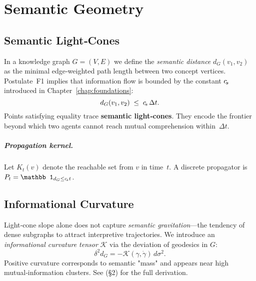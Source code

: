 
\chapter{Semantic Geometry}\label{chap:geometry}

\section{Semantic Light‑Cones}\label{sec:lightcones}

In a knowledge graph $G=(V,E)$ we define the \emph{semantic distance}
$d_G(v_1,v_2)$ as the minimal edge‑weighted path length between two
concept vertices.  Postulate F1 implies that information flow is bounded
by the constant $c_{\!s}$ introduced in Chapter~\ref{chap:foundations}:
\begin{equation}
  d_G(v_1,v_2) \;\le\; c_{\!s}\,\Delta t.
  \label{eq:semantic-cone}
\end{equation}
Points satisfying equality trace \textbf{semantic light‑cones}.  They
encode the frontier beyond which two agents cannot reach mutual
comprehension within $\Delta t$.


\paragraph{Propagation kernel.}  Let $K_t(v)$ denote the reachable set
from $v$ in time $t$.  A discrete propagator is
$P_t=\mathbb 1_{d_G\le\cs t}$.

\section{Informational Curvature}\label{sec:curvature}

Light‑cone slope alone does not capture \emph{semantic gravitation}—the
tendency of dense subgraphs to attract interpretive trajectories.  We
introduce an \emph{informational curvature tensor} $\mathcal K$ via the
deviation of geodesics in $G$:
\begin{equation}
  \delta^2 d_G = -\mathcal K(\gamma,\dot\gamma)\,d\sigma^2.
\end{equation}
Positive curvature corresponds to semantic "mass" and appears near high
mutual‑information clusters.  See \cite{curvaturePDF}(§2) for the full
derivation.

